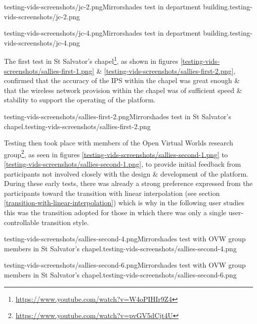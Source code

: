        {testing-vids-screenshots/jc-2.png}{Mirrorshades test in department building.}{testing-vids-screenshots/jc-2.png}

       {testing-vids-screenshots/jc-4.png}{Mirrorshades test in department building.}{testing-vids-screenshots/jc-4.png}

\pagebreak

The first test in St Salvator's chapel\footnote{\url{https://www.youtube.com/watch?v=W4oPIHIr9Z4}}, as shown in figures \ref{testing-vids-screenshots/sallies-first-1.png} \& \ref{testing-vids-screenshots/sallies-first-2.png}, confirmed that the accuracy of the IPS within the chapel was great enough \& that the wireless network provision within the chapel was of sufficient speed \& stability to support the operating of the platform.

       {testing-vids-screenshots/sallies-first-2.png}{Mirrorshades test in St Salvator's chapel.}{testing-vids-screenshots/sallies-first-2.png}

Testing then took place with members of the Open Virtual Worlds research group\footnote{\url{https://www.youtube.com/watch?v=pvGV5dCjt4U}}, as seen in figures \ref{testing-vids-screenshots/sallies-second-1.png} to \ref{testing-vids-screenshots/sallies-second-1.png}, to provide initial feedback from participants not involved closely with the design \& development of the platform. During these early tests, there was already a strong preference expressed from the participants toward the transition with linear interpolation (see section \ref{transition-with-linear-interpolation}) which is why in the following user studies this was the transition adopted for those in which there was only a single user-controllable transition style.

       {testing-vids-screenshots/sallies-second-4.png}{Mirrorshades test with OVW group members in St Salvator's chapel.}{testing-vids-screenshots/sallies-second-4.png}

       {testing-vids-screenshots/sallies-second-6.png}{Mirrorshades test with OVW group members in St Salvator's chapel.}{testing-vids-screenshots/sallies-second-6.png}

